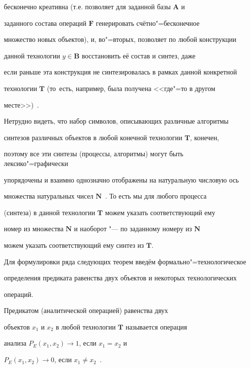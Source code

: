 бесконечно креативна (т.е. позволяет для заданной базы $\mathbf{A}$ и

заданного состава операций $\mathbf{F}$ генерировать счётно"=бесконечное

множество новых объектов), и, во"=вторых, позволяет по любой конструкции

данной технологии $y\in \mathbf{B}$ восстановить её состав и синтез, даже

если раньше эта конструкция не синтезировалась в рамках данной конкретной

технологии $\mathbf{T}$ (то~есть, например, была получена <<где"=то в другом

месте>>)~\cite{krylov:bib6}.



Нетрудно видеть, что набор символов, описывающих различные алгоритмы

синтезов различных объектов в любой конечной технологии $\mathbf{T}$, конечен,

поэтому все эти синтезы (процессы, алгоритмы) могут быть лексико"=графически

упорядочены и взаимно однозначно отображены на натуральную числовую ось

множества натуральных чисел $\mathbf{N}$~\cite{krylov:bib12}. То есть мы для любого процесса

(синтеза) в данной технологии $\mathbf{T}$ можем указать соответствующий ему

номер из множества $\mathbf{N}$ и наоборот "--- по заданному номеру из $\mathbf{N}$

можем указать соответствующий ему синтез из $\mathbf{T}$.



Для формулировки ряда следующих теорем введём формально"=технологическое

определения предиката равенства двух объектов и некоторых технологических

операций.



\smallskip



\begin{definition}[1]Предикатом (аналитической операцией) равенства двух

объектов $x_{1}$ и $x_{2}$ в любой технологии $\mathbf{T}$ называется операция

анализа \linebreak $P_{E}(x_{1}, x_{2}) \to 1$, если $x_{1}=x_{2}$ и

$P_{E}(x_{1}, x_{2})\to 0$, если $x_{1} \ne x_{2}$~\cite{krylov:bib3,krylov:bib6}.

\end{definition}



